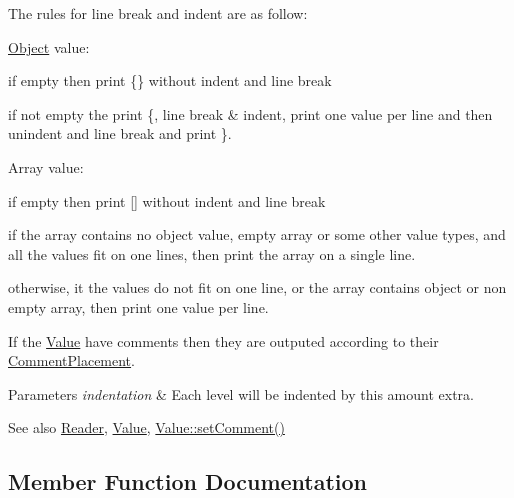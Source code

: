 The rules for line break and indent are as follow\+:
\begin{DoxyItemize}
\item \mbox{\hyperlink{class_object}{Object}} value\+:
\begin{DoxyItemize}
\item if empty then print \{\} without indent and line break
\item if not empty the print \textquotesingle{}\{\textquotesingle{}, line break \& indent, print one value per line and then unindent and line break and print \textquotesingle{}\}\textquotesingle{}.
\end{DoxyItemize}
\item Array value\+:
\begin{DoxyItemize}
\item if empty then print \mbox{[}\mbox{]} without indent and line break
\item if the array contains no object value, empty array or some other value types, and all the values fit on one lines, then print the array on a single line.
\item otherwise, it the values do not fit on one line, or the array contains object or non empty array, then print one value per line.
\end{DoxyItemize}
\end{DoxyItemize}

If the \mbox{\hyperlink{class_json_1_1_value}{Value}} have comments then they are outputed according to their \mbox{\hyperlink{namespace_json_a4fc417c23905b2ae9e2c47d197a45351}{Comment\+Placement}}.


\begin{DoxyParams}{Parameters}
{\em indentation} & Each level will be indented by this amount extra. \\
\hline
\end{DoxyParams}
\begin{DoxySeeAlso}{See also}
\mbox{\hyperlink{class_json_1_1_reader}{Reader}}, \mbox{\hyperlink{class_json_1_1_value}{Value}}, \mbox{\hyperlink{class_json_1_1_value_a29f3a30f7e5d3af6f38d57999bf5b480}{Value\+::set\+Comment()}} 
\end{DoxySeeAlso}


\subsection{Member Function Documentation}
\mbox{\label{class_json_1_1_styled_stream_writer_a07807741c6c43ecd35885a87234d0805}} 
